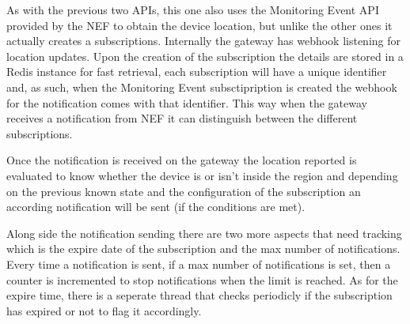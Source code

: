 As with the previous two APIs, this one also uses the Monitoring Event API
provided by the NEF to obtain the device location, but unlike the other ones it
actually creates a subscriptions. Internally the gateway has webhook listening
for location updates. Upon the creation of the subscription the details are
stored in a Redis instance for fast retrieval, each subscription will have a
unique identifier and, as such, when the Monitoring Event subsctipription is
created the webhook for the notification comes with that identifier. This way
when the gateway receives a notification from NEF it can distinguish between
the different subscriptions.

Once the notification is received on the gateway the location reported is
evaluated to know whether the device is or isn't inside the region and
depending on the previous known state and the configuration of the subscription
an according notification will be sent (if the conditions are met).

Along side the notification sending there are two more aspects that need
tracking which is the expire date of the subscription and the max number of
notifications. Every time a notification is sent, if a max number of
notifications is set, then a counter is incremented to stop notifications when
the limit is reached. As for the expire time, there is a seperate thread that
checks periodicly if the subscription has expired or not to flag it
accordingly.
